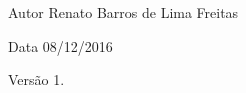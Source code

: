 \begin{DoxyAuthor}{Autor}
Renato Barros de Lima Freitas 
\end{DoxyAuthor}
\begin{DoxyDate}{Data}
08/12/2016 
\end{DoxyDate}
\begin{DoxyVersion}{Versão}
1. 
\end{DoxyVersion}
